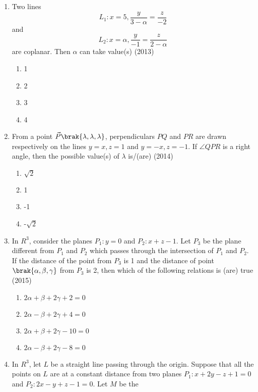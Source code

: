 \begin{enumerate}[label=\thesubsection.\arabic*.,ref=\thesubsection.\theenumi]
\begin{multicols}{4}
\begin{enumerate}
			\item $\brak{\frac{7}{9},\frac{7}{9},\frac{8}{9}}$
		\end{enumerate}
\end{multicols}
	\item Two lines $$L_1: x=5,\frac{y}{3-\alpha}=\frac{z}{-2}$$ and $$L_2: x=\alpha,\frac{y}{-1}=\frac{z}{2-\alpha}$$ are coplanar. Then $\alpha$ can take value(s) \hfill{(2013)}
\begin{multicols}{4}
		\begin{enumerate}
			\item 1
			\item 2 
			\item 3
			\item 4
		\end{enumerate}
\end{multicols}
	\item From a point $\vec{P}\brak{\lambda,\lambda,\lambda}$, perpendiculars $PQ$ and $PR$ are drawn respectively on the lines $y=x,z=1$ and $y=-x,z=-1$. If $\angle QPR$ is a right angle, then
		the possible value(s) of $\lambda$ is/(are) \hfill{(2014)}
\begin{multicols}{4}
		\begin{enumerate}
			\item $\sqrt{2}$
			\item 1 
			\item -1 
			\item -$\sqrt{2}$
		\end{enumerate}
\end{multicols}
	\item In $R^3$, consider the planes $P_1:y=0$ and $P_2:x+z-1$. Let $P_3$ be the plane different from $P_1$ and $P_2$ which passes through the intersection of $P_1$ and $P_2$. If the distance of the
		point  from $P_3$ is 1 and the distance of point $\brak{\alpha,\beta,\gamma}$ from $P_3$ is 2,  then which of the following relations is (are) true \hfill{(2015)}
\begin{multicols}{2}
		\begin{enumerate}
			\item $2\alpha+\beta+2\gamma+2=0$
			\item $2\alpha-\beta+2\gamma+4=0$
			\item $2\alpha+\beta+2\gamma-10=0$
			\item $2\alpha-\beta+2\gamma-8=0$
		\end{enumerate}
\end{multicols}
	\item In $R^3$, let $L$ be a straight line passing through the origin. Suppose that all the points on $L$ are at a constant distance from two planes $P_1:x+2y-z+1=0$ and $P_2:2x-y+z-1=0$. Let $M$ be the

\end{enumerate}
